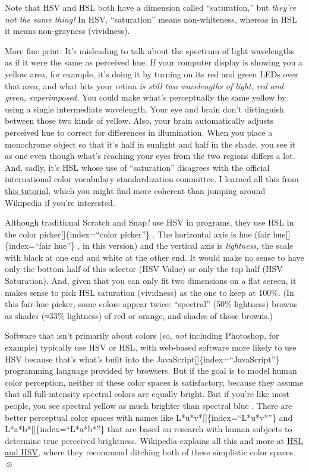 \documentclass[
  letterpaper,
]{book}
\begin{document}
Note that HSV and HSL both have a dimension called ``saturation,'' but
\emph{they're not the same thing!} In HSV, ``saturation'' means
non-whiteness, whereas in HSL it means non-grayness (vividness).

More fine print: It's misleading to talk about the spectrum of light
wavelengths as if it were the same as perceived hue. If your computer
display is showing you a yellow area, for example, it's doing it by
turning on its red and green LEDs over that area, and what hits your
retina \emph{is still two wavelengths of light, red and green,
superimposed.} You could make what's perceptually the same yellow by
using a single intermediate wavelength. Your eye and brain don't
distinguish between those two kinds of yellow. Also, your brain
automatically adjusts perceived hue to correct for differences in
illumination. When you place a monochrome object so that it's half in
sunlight and half in the shade, you see it as one even though what's
reaching your eyes from the two regions differs a lot. And, sadly, it's
HSL whose use of ``saturation'' disagrees with the official
international color vocabulary standardization committee. I learned all
this from \href{http://www.huevaluechroma.com/011.php}{this tutorial},
which you might find more coherent than jumping around Wikipedia if
you're interested.

Although traditional Scratch and Snap\emph{!} use HSV in programs, they
use HSL in the color picker{[}{]}\{index=``color picker''\} . The
horizontal axis is hue (fair hue{[}{]}\{index=``fair hue''\} , in this
version) and the vertical axis is \emph{lightness,} the scale with black
at one end and white at the other end. It would make no sense to have
only the bottom half of this selector (HSV Value) or only the top half
(HSV Saturation). And, given that you can only fit two dimensions on a
flat screen, it makes sense to pick HSL saturation (vividness) as the
one to keep at 100\%. (In this fair-hue picker, some colors appear
twice: ``spectral'' (50\% lightness) browns as shades (≈33\% lightness)
of red or orange, and shades of those browns.)

Software that isn't primarily about colors (so, \emph{not} including
Photoshop, for example) typically use HSV or HSL, with web-based
software more likely to use HSV because that's what's built into the
JavaScript{[}{]}\{index=``JavaScript''\} programming language provided
by browsers. But if the goal is to model human color perception, neither
of these color spaces is satisfactory, because they assume that all
full-intensity spectral colors are equally bright. But if you're like
most people, you see spectral yellow as much brighter than spectral blue
. There are better perceptual color spaces with names like
L*u*v*{[}{]}\{index=``L*u*v*''\} and L*a*b*{[}{]}\{index=``L*a*b*''\}
that are based on research with human subjects to determine true
perceived brightness. Wikipedia explains all this and more at
\href{https://en.wikipedia.org/wiki/HSL_and_HSV}{HSL and HSV}, where
they recommend ditching both of these simplistic color spaces. ☺
\end{document}
